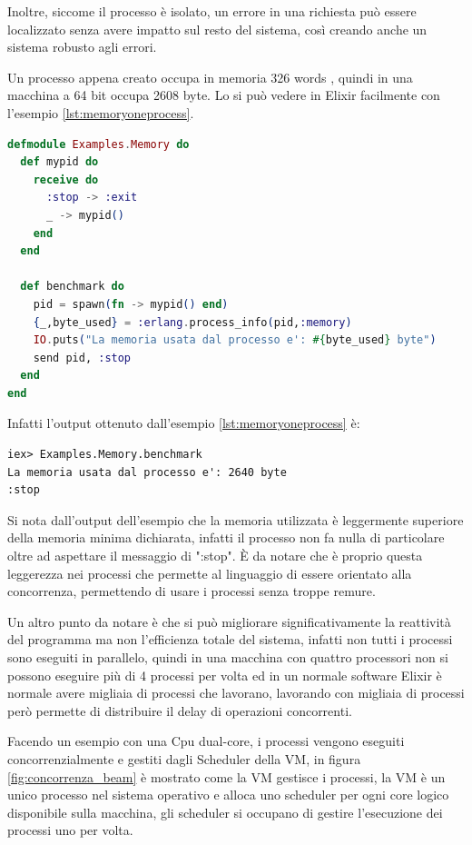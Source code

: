 Inoltre, siccome il processo è isolato, un errore in una richiesta
può essere localizzato senza avere impatto
sul resto del sistema, così creando anche un sistema robusto
agli errori.

Un processo appena creato occupa in memoria 326 words \cite{ErlangPr21:online},
quindi in una macchina a 64 bit occupa 2608 byte.
Lo si può vedere in Elixir facilmente con l'esempio \ref{lst:memoryoneprocess}.

\begin{lstlisting}[language=elixir, caption={Memoria in un processo},captionpos=b,
	label={lst:memoryoneprocess}]
defmodule Examples.Memory do
  def mypid do
    receive do
      :stop -> :exit
      _ -> mypid()
    end
  end
 
  def benchmark do
    pid = spawn(fn -> mypid() end)
    {_,byte_used} = :erlang.process_info(pid,:memory)
    IO.puts("La memoria usata dal processo e': #{byte_used} byte")
    send pid, :stop
  end
end
\end{lstlisting}

Infatti l'output ottenuto dall'esempio \ref{lst:memoryoneprocess} è:
\begin{lstlisting}[language=none]
iex> Examples.Memory.benchmark
La memoria usata dal processo e': 2640 byte
:stop
\end{lstlisting}
	
Si nota dall'output dell'esempio che la memoria utilizzata
è leggermente superiore della memoria minima dichiarata,
infatti il processo non fa nulla di particolare oltre
ad aspettare il messaggio di ":stop".
È da notare che è proprio questa leggerezza nei processi che
permette al linguaggio di essere orientato alla concorrenza,
permettendo di usare i processi senza troppe remure. 

Un altro punto da notare è che si può migliorare significativamente
la reattività del programma ma non l'efficienza totale del
sistema, infatti non tutti i processi
sono eseguiti in parallelo, quindi in una macchina con quattro
processori non si possono eseguire più di 4 processi per volta
ed in un normale software Elixir è normale avere migliaia di
processi che lavorano, lavorando con migliaia di processi
però permette di distribuire il delay di operazioni concorrenti.

Facendo un esempio con una Cpu dual-core,
i processi vengono eseguiti concorrenzialmente e gestiti
dagli Scheduler della VM,
in figura \ref{fig:concorrenza_beam} è mostrato come
la VM gestisce i processi, la VM è un unico processo
nel sistema operativo e alloca uno scheduler per ogni
core logico disponibile sulla macchina, gli scheduler si
occupano di gestire l'esecuzione dei processi uno per volta.

